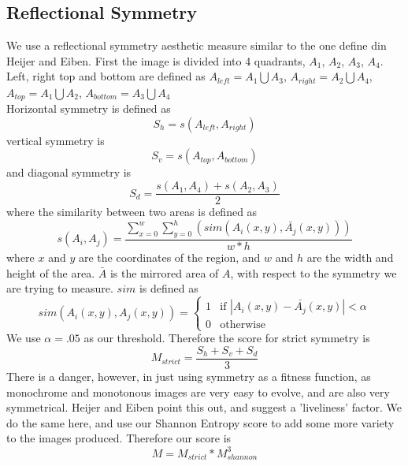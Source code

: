 \documentclass{article}
\begin{document}
\subsection*{Reflectional Symmetry}
We use a reflectional symmetry aesthetic measure similar to the one define din Heijer and Eiben. First the image is divided into 4 quadrants, $A_1$, $A_2$, $A_3$, $A_4$. Left, right top and bottom are defined as
$A_{left} = A_1 \bigcup A_3$, $A_{right} = A_2 \bigcup A_4$, $A_{top} = A_1 \bigcup A_2$, $A_{bottom} = A_3 \bigcup A_4$\\
Horizontal symmetry is defined as 
\begin{equation*}
    S_h = s(A_{left}, A_{right})
\end{equation*}
vertical symmetry is 
\begin{equation*}
    S_v = s(A_{top}, A_{bottom})
\end{equation*}
and diagonal symmetry is 
\begin{equation*}
    S_d = \frac{s(A_1, A_4) + s(A_2, A_3)}{2}
\end{equation*}
where the similarity between two areas is defined as 
\begin{equation*}
    s(A_i, A_j) = \frac{\sum^w_{x=0} \sum^h_{y=0}(sim(A_i(x,y), \bar{A_j}(x,y)))}{w*h}
\end{equation*}
where $x$ and $y$ are the coordinates of the region, and $w$ and $h$ are the width and height of the area. $\bar{A}$ is the mirrored area of $A$, with respect to the 
symmetry we are trying to measure. $sim$ is defined as
\[
    sim(A_i(x,y), A_j(x,y)) = 
    \begin{cases}
        1 & \text{if   } |A_i(x,y) - \bar{A_j}(x,y)| < \alpha\\
        0 & \text{otherwise}
    \end{cases}
\]
We use $\alpha = .05$ as our threshold.
Therefore the score for strict symmetry is 
\begin{equation*}
    M_{strict} = \frac{S_h + S_v + S_d}{3}
\end{equation*}
There is a danger, however, in just using symmetry as a fitness function, as monochrome and monotonous images are very easy to evolve, and are also very symmetrical. Heijer and Eiben point this out, and suggest
a 'liveliness' factor. We do the same here, and use our Shannon Entropy score to add some more variety to the images produced.
Therefore our score is 
\begin{equation*}
    M = M_{strict} * M_{shannon}^3
\end{equation*}
\end{document}
